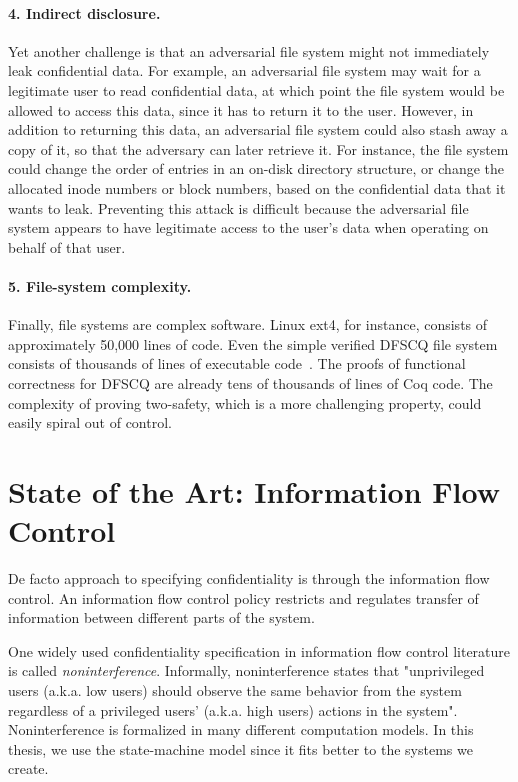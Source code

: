 \paragraph{4. Indirect disclosure.}
Yet another challenge is that an adversarial
file system might not immediately leak confidential data.  For example,
an adversarial file system may wait for a legitimate user to read
confidential data, at which point the file system would be allowed to
access this data, since it has to return it to the user.  However, in
addition to returning this data, an adversarial file system could also
stash away a copy of it, so that the adversary can later retrieve it.
For instance, the file system could change the order of entries in an
on-disk directory structure, or change the allocated inode numbers or
block numbers, based on the confidential data that it wants to leak.
Preventing this attack is difficult because the adversarial file system
appears to have legitimate access to the user's data when operating on
behalf of that user.

\paragraph{5. File-system complexity.}
Finally, file systems are complex software. Linux ext4, for
instance, consists of approximately 50,000 lines of code.  Even the simple
verified DFSCQ file system consists of thousands of lines of executable
code~\cite{chen:dfscq}.  The proofs of functional correctness for DFSCQ
are already tens of thousands of lines of Coq code. The complexity of
proving two-safety, which is a more challenging property, could easily
spiral out of control.

\section{State of the Art: Information Flow Control}
De facto approach to specifying confidentiality is through the information flow control. An information flow control policy restricts and regulates transfer of information between different parts of the system.

One widely used confidentiality specification in information flow control literature is called \emph{noninterference}. Informally, noninterference states that "unprivileged users (a.k.a. low users) should observe the same behavior from the system regardless of a privileged users' (a.k.a. high users) actions in the system". Noninterference is formalized in many different computation models. In this thesis, we use the state-machine model since it fits better to the systems we create.

